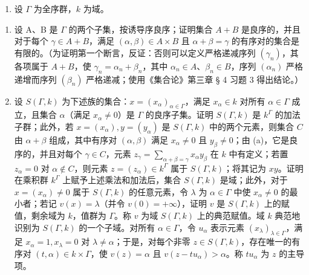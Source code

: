 \begin{enumerate}
\def\labelenumi{\arabic{enumi}.}
\setcounter{enumi}{1}
\tightlist
\item
  设 \(\Gamma\) 为全序群，\(k\) 为域。
\end{enumerate}

\begin{enumerate}
\def\labelenumi{(\alph{enumi})}
\item
  设 A、B 是 \(\Gamma\) 的两个子集，按诱导序良序；证明集合 \(A + B\) 是良序的，并且对于每个 \(\gamma \in A + B\)，满足 \((\alpha, \beta) \in A \times B\) 且 \(\alpha + \beta = \gamma\) 的有序对的集合是有限的。（为证明第一个断言，反证：否则可以定义严格递减序列 \((\gamma_n)\)，其各项属于 \(A + B\)，使 \(\gamma_n = \alpha_n + \beta_n\)，其中 \(\alpha_n \in A\)、\(\beta_n \in B\)，序列 \((\alpha_n)\) 严格递增而序列 \((\beta_n)\) 严格递减；使用《集合论》第三章 § 4 习题 3 得出结论。）
\item
  设 \(S(\Gamma, k)\) 为下述族的集合：\(x = (x_{\alpha})_{\alpha \in \Gamma}\)，满足 \(x_{\alpha} \in k\) 对所有 \(\alpha \in \Gamma\) 成立，且集合 \(\alpha\)（满足 \(x_{\alpha} \neq 0\)）是 \(\Gamma\) 的良序子集。证明 \(S(\Gamma, k)\) 是 \(k^{\Gamma}\) 的加法子群；此外，若 \(x = (x_{\alpha}), y = (y_{\alpha})\) 是 \(S(\Gamma, k)\) 中的两个元素，则集合 \(C\) 由 \(\alpha + \beta\) 组成，其中有序对 \((\alpha, \beta)\) 满足 \(x_{\alpha} \neq 0\) 且 \(y_{\beta} \neq 0\)；由 (a)，它是良序的，并且对每个 \(\gamma \in C\)，元素 \(z_{\gamma} = \sum_{\alpha + \beta = \gamma} x_{\alpha} y_{\beta}\) 在 \(k\) 中有定义；若置 \(z_{\alpha} = 0\) 对 \(\alpha \notin C\)，则元素 \(z = (z_{\alpha}) \in k^{\Gamma}\) 属于 \(S(\Gamma, k)\)；将其记为 \(xy\)。证明在乘积群 \(k^{\Gamma}\) 上赋予上述乘法和加法后，集合 \(S(\Gamma, k)\) 是域；此外，对于 \(x = (x_{\alpha}) \neq 0\) 属于 \(S(\Gamma, k)\) 的任意元素，令 \(\lambda\) 为 \(\alpha \in \Gamma\) 中使 \(x_{\alpha} \neq 0\) 的最小者；若记 \(v(x) = \lambda\)（并令 \(v(0) = +\infty\)），证明 \(v\) 是 \(S(\Gamma, k)\) 上的赋值，剩余域为 \(k\)，值群为 \(\Gamma\)。称 \(v\) 为域 \(S(\Gamma, k)\) 上的典范赋值。域 \(k\) 典范地识别为 \(S(\Gamma, k)\) 的一个子域。对所有 \(\alpha \in \Gamma\)，令 \(u_{\alpha}\) 表示元素 \((x_{\lambda})_{\lambda \in \Gamma}\)，满足 \(x_{\alpha} = 1, x_{\lambda} = 0\) 对 \(\lambda \neq \alpha\)；于是，对每个非零 \(z \in S(\Gamma, k)\)，存在唯一的有序对 \((t, \alpha) \in k \times \Gamma\)，使 \(v(z) = \alpha\) 且 \(v(z - tu_{\alpha}) > \alpha\)。称 \(tu_{\alpha}\) 为 \(z\) 的主导项。
\end{enumerate}

